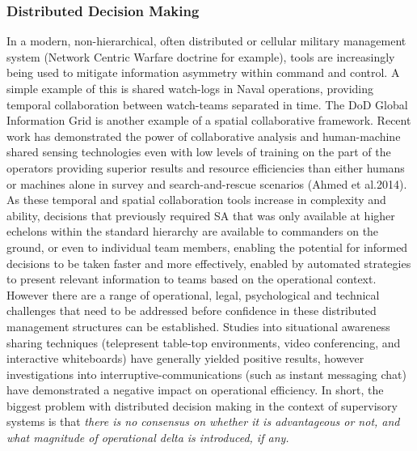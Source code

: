  \subsubsection{Distributed Decision Making}
 In a modern, non-hierarchical, often distributed or cellular military management system (Network Centric Warfare doctrine for example), tools are increasingly being used to mitigate information asymmetry within command and control.
 A simple example of this is shared watch-logs in Naval operations, providing temporal collaboration between watch-teams separated in time.
 The DoD Global Information Grid is another example of a spatial collaborative framework.
 Recent work has demonstrated the power of collaborative analysis and human-machine shared sensing technologies even with low levels of training on the part of the operators providing superior results and resource efficiencies than either humans or machines alone in survey and search-and-rescue scenarios (Ahmed et al.2014).
 As these temporal and spatial collaboration tools increase in complexity and ability, decisions that previously required SA that was only available at higher echelons within the standard hierarchy are available to commanders on the ground, or even to individual team members, enabling the potential for informed decisions to be taken faster and more effectively, enabled by automated strategies to present relevant information to teams based on the operational context.
 However there are a range of operational, legal, psychological and technical challenges that need to be addressed before confidence in these distributed management structures can be established.
 Studies into situational awareness sharing techniques (telepresent table-top environments, video conferencing, and interactive whiteboards) have generally yielded positive results, however investigations into interruptive-communications (such as instant messaging chat) have demonstrated a negative impact on operational efficiency.
 In short, the biggest problem with distributed decision making in the context of supervisory systems is that \textit{there is no consensus on whether it is advantageous or not, and what magnitude of operational delta is introduced, if any.}
 
